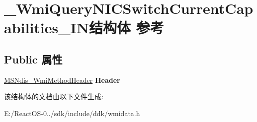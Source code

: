 \hypertarget{struct___wmi_query_n_i_c_switch_current_capabilities___i_n}{}\section{\+\_\+\+Wmi\+Query\+N\+I\+C\+Switch\+Current\+Capabilities\+\_\+\+I\+N结构体 参考}
\label{struct___wmi_query_n_i_c_switch_current_capabilities___i_n}
\subsection*{Public 属性}
\begin{DoxyCompactItemize}
\item 
\mbox{\label{struct___wmi_query_n_i_c_switch_current_capabilities___i_n_a95b23375566fa7b07735c70ad19efcc8}} 
\hyperlink{struct___m_s_ndis___wmi_method_header}{M\+S\+Ndis\+\_\+\+Wmi\+Method\+Header} {\bfseries Header}
\end{DoxyCompactItemize}


该结构体的文档由以下文件生成\+:\begin{DoxyCompactItemize}
\item 
E\+:/\+React\+O\+S-\/0../sdk/include/ddk/wmidata.\+h\end{DoxyCompactItemize}

